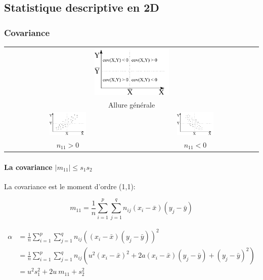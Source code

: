 \subsection{Statistique descriptive en 2D}


\subsubsection{Covariance}

\begin{center}
	\begin{tabular}{cc}
		\multicolumn{2}{c}{\includegraphics[width=0.3\textwidth]{images/covariance-all.pdf}}\\
		\multicolumn{2}{c}{Allure générale}\\
		\includegraphics[width=0.3\textwidth]{images/covariance-positive.pdf}&\includegraphics[width=0.3\textwidth]{images/covariance-negative.pdf}\\
		$n_{11}>0$&$n_{11}<0$
	\end{tabular}
\end{center}





\paragraph{La covariance $|m_{11}| \leq s_1s_2$}

La covariance est le moment d'ordre (1,1):

$$m_{11}=\frac{1}{n} \sum_{i=1}^{p} \sum_{j=1}^{q} n_{ij} (x_i-\bar{x})(y_j-\bar{y})$$

\begin{align}
\alpha  &= \label{carre} \frac{1}{n} \sum_{i=1}^{p} \sum_{j=1}^{q} n_{ij} ((x_i-\bar{x})(y_j-\bar{y}))^2 \\
        &= \frac{1}{n} \sum_{i=1}^{p} \sum_{j=1}^{q} n_{ij} (u^2(x_i-\bar{x})^2 + 2a(x_i-\bar{x})(y_j-\bar{y})+(y_j-\bar{y})^2)\\
        &= u^2s_1^2+2u\ m_{11}+s_2^2
\end{align}

